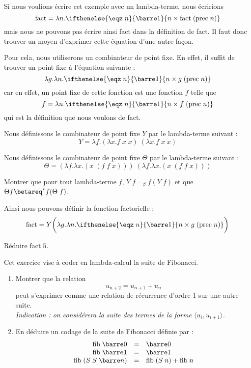 Si nous voulions écrire cet exemple avec un lambda-terme, nous écririons $$\mathrm{fact}=\lambda n.\ifthenelse{\eqz\;n}{\barre 1}{n\times \mathrm{fact}\;(\mathrm{prec}\;n)}$$ mais nous ne pouvons pas écrire ainsi fact dans la définition de fact. Il faut donc trouver un moyen d'exprimer cette équation d'une autre façon.

Pour cela, nous utiliserons un combinateur de point fixe. En effet, il suffit de trouver un point fixe à l'équation suivante : $$\lambda g.\lambda n.\ifthenelse{\eqz\;n}{\barre 1}{n\times g\;(\mathrm{prec}\;n)}$$ car en effet, un point fixe de cette fonction est une fonction $f$ telle que $$f=\lambda n.\ifthenelse{\eqz\;n}{\barre 1}{n\times f\;(\mathrm{prec}\;n)}$$ qui est la définition que nous voulons de fact.

\begin{defi}
    Nous définissons le combinateur de point fixe $Y$ par le lambda-terme suivant : $$Y=\lambda f.(\lambda x.f\;x\;x)\;(\lambda x.f\;x\;x)$$
    
    Nous définissons le combinateur de point fixe $\Theta$ par le lambda-terme suivant :
    $$\Theta = (\lambda f.\lambda x. (x\;(f\;f\;x)))\;(\lambda f.\lambda x. (x\;(f\;f\;x)))$$
\end{defi}

\begin{exo}
    Montrer que pour tout lambda-terme $f$, $Y\;f=_\beta f(Y\;f)$ et que $\Theta f \betareq^* f(\Theta\; f)$.
\end{exo}

Ainsi nous pouvons définir la fonction factorielle :
$$\mathrm{fact} = Y \bigg(\lambda g.\lambda n.\ifthenelse{\eqz\;n}{\barre 1}{n\times g\;(\mathrm{prec}\;n)}\bigg)$$

\begin{exo}
    Réduire $\mathrm{fact}\;5$.
\end{exo}

\begin{exo}
    Cet exercice vise à coder en lambda-calcul la suite de Fibonacci.
    \begin{enumerate}
        \item Montrer que la relation $$u_{n+2}=u_{n+1}+u_n$$ peut s'exprimer comme une relation de récurrence d'ordre $1$ sur une autre suite. \\
        \textit{Indication : on considérera la suite des termes de la forme $\langle u_i,u_{i+1}\rangle$.}
        \item En déduire un codage de la suite de Fibonacci définie par :
        $$\begin{array}{rcl}
            \mathrm{fib}\; \barre 0 &=& \barre 0 \\
            \mathrm{fib}\; \barre 1 &=& \barre 1 \\
            \mathrm{fib}\; (S\;S\;\barre n) &=& \mathrm{fib}\;(S\;n) + \mathrm{fib}\;n\\
        \end{array} $$
    \end{enumerate}
\end{exo}

\newpage